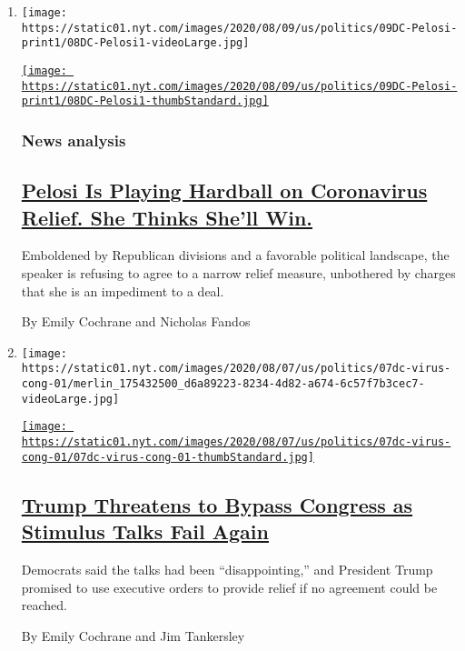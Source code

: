 \begin{enumerate}
\def\labelenumi{\arabic{enumi}.}
\item
  \texttt{[image: https://static01.nyt.com/images/2020/08/09/us/politics/09DC-Pelosi-print1/08DC-Pelosi1-videoLarge.jpg]}

  \href{/2020/08/08/us/politics/nancy-pelosi-coronavirus-relief.html}{\texttt{[image: https://static01.nyt.com/images/2020/08/09/us/politics/09DC-Pelosi-print1/08DC-Pelosi1-thumbStandard.jpg]}}

  \hypertarget{news-analysis}{%
  \subsubsection{News analysis}\label{news-analysis}}

  \hypertarget{pelosi-is-playing-hardball-on-coronavirus-relief-she-thinks-shell-win}{%
  \subsection{\texorpdfstring{\href{/2020/08/08/us/politics/nancy-pelosi-coronavirus-relief.html}{Pelosi
  Is Playing Hardball on Coronavirus Relief. She Thinks She'll
  Win.}}{Pelosi Is Playing Hardball on Coronavirus Relief. She Thinks She'll Win.}}\label{pelosi-is-playing-hardball-on-coronavirus-relief-she-thinks-shell-win}}

  Emboldened by Republican divisions and a favorable political
  landscape, the speaker is refusing to agree to a narrow relief
  measure, unbothered by charges that she is an impediment to a deal.

  By Emily Cochrane and Nicholas Fandos
\item
  \texttt{[image: https://static01.nyt.com/images/2020/08/07/us/politics/07dc-virus-cong-01/merlin\_175432500\_d6a89223-8234-4d82-a674-6c57f7b3cec7-videoLarge.jpg]}

  \href{/2020/08/07/us/politics/trump-congress-stimulus.html}{\texttt{[image: https://static01.nyt.com/images/2020/08/07/us/politics/07dc-virus-cong-01/07dc-virus-cong-01-thumbStandard.jpg]}}

  \hypertarget{trump-threatens-to-bypass-congress-as-stimulus-talks-fail-again}{%
  \subsection{\texorpdfstring{\href{/2020/08/07/us/politics/trump-congress-stimulus.html}{Trump
  Threatens to Bypass Congress as Stimulus Talks Fail
  Again}}{Trump Threatens to Bypass Congress as Stimulus Talks Fail Again}}\label{trump-threatens-to-bypass-congress-as-stimulus-talks-fail-again}}

  Democrats said the talks had been ``disappointing,'' and President
  Trump promised to use executive orders to provide relief if no
  agreement could be reached.

  By Emily Cochrane and Jim Tankersley
\end{enumerate}

